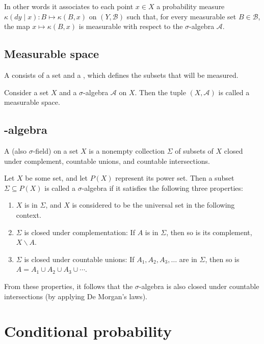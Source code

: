 In other words it associates to each point $x \in X$ a probability measure $\kappa(d y \mid x): B \mapsto \kappa(B, x)$ on $(Y, \mathcal{B})$ such that, for every measurable set $B \in \mathcal{B}$, the map $x \mapsto \kappa(B, x)$ is measurable with respect to the $\sigma$-algebra $\mathcal{A}$.


\subsection{Measurable space}
\label{sec:measurable-space}

A  consists of a set and a , which defines the subsets that will be measured.

Consider a set \(X\) and a \(\sigma\)-algebra \(\mathcal{A}\) on \(X\).
Then the tuple \((X, \mathcal{A})\) is called a measurable space.

\subsection{\protect{\(\sigma\)}-algebra}


A  (also \(\sigma\)-field) on a set \(X\) is a nonempty collection \(\Sigma\) of subsets of \(X\) closed under complement, countable unions, and countable intersections.

Let $X$ be some set, and let $P(X)$ represent its power set.
Then a subset $\Sigma \subseteq P(X)$ is called a $\sigma$-algebra if it satisfies the following three properties:
\begin{enumerate}
\item $X$ is in $\Sigma$, and $X$ is considered to be the universal set in the following context.
\item $\Sigma$ is closed under complementation: If $A$ is in $\Sigma$, then so is its complement, $X \backslash A$.
\item $\Sigma$ is closed under countable unions: If $A_1, A_2, A_3, \ldots$ are in $\Sigma$, then so is $A=A_1 \cup A_2 \cup A_3 \cup \cdots$.
\end{enumerate}

From these properties, it follows that the $\sigma$-algebra is also closed under countable intersections (by applying De Morgan's laws).

\section{Conditional probability}
\label{sec:cond-prob}

